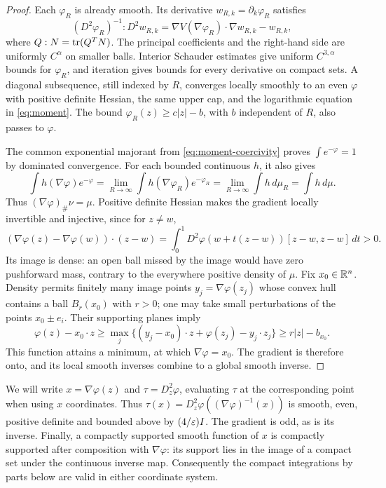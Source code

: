 \begin{proof}
Each $\varphi_R$ is already smooth.  Its derivative
$w_{R,k}=\partial_k\varphi_R$ satisfies
\[
 (D^2\varphi_R)^{-1}:D^2w_{R,k}
   =\nabla V(\nabla\varphi_R)\cdot\nabla w_{R,k}-w_{R,k},
\]
where $Q:N=\operatorname{tr}(Q^TN)$.  The principal coefficients and the
right-hand side are uniformly $C^\alpha$ on smaller balls.
Interior Schauder estimates
\cite[Theorem~2.20 and Corollary~2.21]{FernandezRealRosOton2023}
give uniform $C^{3,\alpha}$ bounds for $\varphi_R$, and iteration
gives bounds for every derivative on compact sets.
A diagonal subsequence, still indexed by $R$, converges locally smoothly to an even
$\varphi$ with positive definite Hessian, the same upper cap, and
the logarithmic equation in \eqref{eq:moment}.
The bound $\varphi_R(z)\ge c|z|-b$, with $b$ independent of $R$,
also passes to $\varphi$.

The common exponential majorant from \eqref{eq:moment-coercivity}
proves $\int e^{-\varphi}=1$ by dominated convergence.  For each
bounded continuous $h$, it also gives
\[
 \int h(\nabla\varphi)e^{-\varphi}
 =\lim_{R\to\infty}\int h(\nabla\varphi_R)e^{-\varphi_R}
 =\lim_{R\to\infty}\int h\,d\mu_R
 =\int h\,d\mu.
\]
Thus $(\nabla\varphi)_\#\nu=\mu$.
Positive definite Hessian makes the gradient locally invertible and
injective, since for $z\ne w$,
\[
 (\nabla\varphi(z)-\nabla\varphi(w))\cdot(z-w)
 =\int_0^1 D^2\varphi(w+t(z-w))[z-w,z-w]\,dt>0.
\]
Its image is dense: an open ball missed by the image would have zero
pushforward mass, contrary to the everywhere positive density of
$\mu$.  Fix $x_0\in\mathbb R^n$.  Density permits finitely many image
points $y_j=\nabla\varphi(z_j)$ whose convex hull contains a ball
$B_r(x_0)$ with $r>0$; one may take small perturbations of the
points $x_0\pm e_i$.  Their supporting planes imply
\[
 \varphi(z)-x_0\cdot z
 \ge\max_j\{(y_j-x_0)\cdot z+\varphi(z_j)-y_j\cdot z_j\}
 \ge r|z|-b_{x_0}.
\]
This function attains a minimum, at which
$\nabla\varphi=x_0$.  The gradient is therefore onto, and its local
smooth inverses combine to a global smooth inverse.
\end{proof}

We will write $x=\nabla\varphi(z)$ and
$\tau=D_z^2\varphi$, evaluating $\tau$ at the corresponding point
when using $x$ coordinates.  Thus
$\tau(x)=D_z^2\varphi((\nabla\varphi)^{-1}(x))$ is smooth, even,
positive definite and bounded above by $(4/\varepsilon)I$.
The gradient is odd, as is its inverse.  Finally, a compactly
supported smooth function of $x$ is compactly supported after
composition with $\nabla\varphi$: its support lies in the image of
a compact set under the continuous inverse map.  Consequently the
compact integrations by parts below are valid in either coordinate
system.
